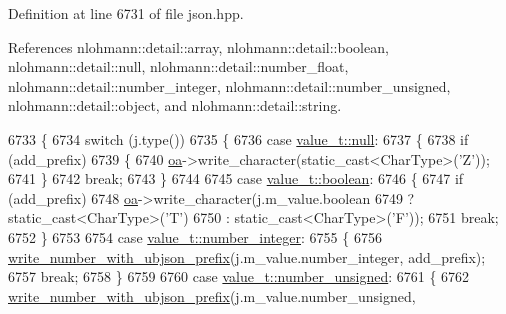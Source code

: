 Definition at line 6731 of file json.\+hpp.



References nlohmann\+::detail\+::array, nlohmann\+::detail\+::boolean, nlohmann\+::detail\+::null, nlohmann\+::detail\+::number\+\_\+float, nlohmann\+::detail\+::number\+\_\+integer, nlohmann\+::detail\+::number\+\_\+unsigned, nlohmann\+::detail\+::object, and nlohmann\+::detail\+::string.


\begin{DoxyCode}
6733     \{
6734         \textcolor{keywordflow}{switch} (j.type())
6735         \{
6736             \textcolor{keywordflow}{case} \hyperlink{namespacenlohmann_1_1detail_a1ed8fc6239da25abcaf681d30ace4985a37a6259cc0c1dae299a7866489dff0bd}{value\_t::null}:
6737             \{
6738                 \textcolor{keywordflow}{if} (add\_prefix)
6739                 \{
6740                     \hyperlink{classnlohmann_1_1detail_1_1binary__writer_a6f15b782a7900f50ef37d123008e601b}{oa}->write\_character(static\_cast<CharType>(\textcolor{charliteral}{'Z'}));
6741                 \}
6742                 \textcolor{keywordflow}{break};
6743             \}
6744 
6745             \textcolor{keywordflow}{case} \hyperlink{namespacenlohmann_1_1detail_a1ed8fc6239da25abcaf681d30ace4985a84e2c64f38f78ba3ea5c905ab5a2da27}{value\_t::boolean}:
6746             \{
6747                 \textcolor{keywordflow}{if} (add\_prefix)
6748                     \hyperlink{classnlohmann_1_1detail_1_1binary__writer_a6f15b782a7900f50ef37d123008e601b}{oa}->write\_character(j.m\_value.boolean
6749                                         ? static\_cast<CharType>(\textcolor{charliteral}{'T'})
6750                                         : static\_cast<CharType>(\textcolor{charliteral}{'F'}));
6751                 \textcolor{keywordflow}{break};
6752             \}
6753 
6754             \textcolor{keywordflow}{case} \hyperlink{namespacenlohmann_1_1detail_a1ed8fc6239da25abcaf681d30ace4985a5763da164f8659d94a56e29df64b4bcc}{value\_t::number\_integer}:
6755             \{
6756                 \hyperlink{classnlohmann_1_1detail_1_1binary__writer_a6a40756933ccc4f69e3d885fe2e9032b}{write\_number\_with\_ubjson\_prefix}(j.m\_value.number\_integer, 
      add\_prefix);
6757                 \textcolor{keywordflow}{break};
6758             \}
6759 
6760             \textcolor{keywordflow}{case} \hyperlink{namespacenlohmann_1_1detail_a1ed8fc6239da25abcaf681d30ace4985adce7cc8ec29055c4158828921f2f265e}{value\_t::number\_unsigned}:
6761             \{
6762                 \hyperlink{classnlohmann_1_1detail_1_1binary__writer_a6a40756933ccc4f69e3d885fe2e9032b}{write\_number\_with\_ubjson\_prefix}(j.m\_value.number\_unsigned, 

\end{DoxyCode}
